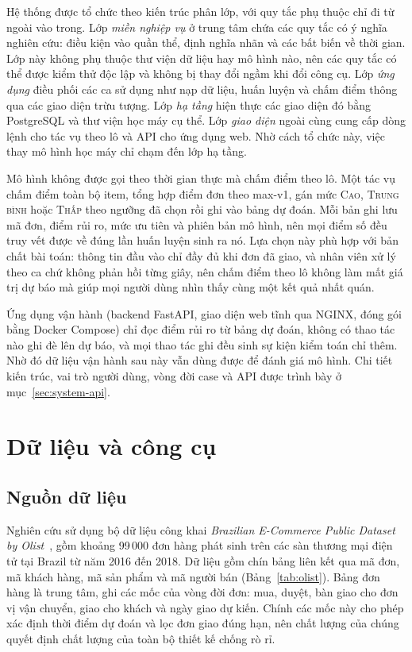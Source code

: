 \documentclass[12pt,a4paper]{report}
\begin{document}
Hệ thống được tổ chức theo kiến trúc phân lớp, với quy tắc phụ thuộc chỉ đi từ ngoài vào trong. Lớp \emph{miền nghiệp vụ} ở trung tâm chứa các quy tắc có ý nghĩa nghiên cứu: điều kiện vào quần thể, định nghĩa nhãn và các bất biến về thời gian. Lớp này không phụ thuộc thư viện dữ liệu hay mô hình nào, nên các quy tắc có thể được kiểm thử độc lập và không bị thay đổi ngầm khi đổi công cụ. Lớp \emph{ứng dụng} điều phối các ca sử dụng như nạp dữ liệu, huấn luyện và chấm điểm thông qua các giao diện trừu tượng. Lớp \emph{hạ tầng} hiện thực các giao diện đó bằng PostgreSQL và thư viện học máy cụ thể. Lớp \emph{giao diện} ngoài cùng cung cấp dòng lệnh cho tác vụ theo lô và API cho ứng dụng web. Nhờ cách tổ chức này, việc thay mô hình học máy chỉ chạm đến lớp hạ tầng.

Mô hình không được gọi theo thời gian thực mà chấm điểm theo lô. Một tác vụ chấm điểm toàn bộ item, tổng hợp điểm đơn theo max-v1, gán mức \textsc{Cao}, \textsc{Trung bình} hoặc \textsc{Thấp} theo ngưỡng đã chọn rồi ghi vào bảng dự đoán. Mỗi bản ghi lưu mã đơn, điểm rủi ro, mức ưu tiên và phiên bản mô hình, nên mọi điểm số đều truy vết được về đúng lần huấn luyện sinh ra nó. Lựa chọn này phù hợp với bản chất bài toán: thông tin đầu vào chỉ đầy đủ khi đơn đã giao, và nhân viên xử lý theo ca chứ không phản hồi từng giây, nên chấm điểm theo lô không làm mất giá trị dự báo mà giúp mọi người dùng nhìn thấy cùng một kết quả nhất quán.

Ứng dụng vận hành (backend FastAPI, giao diện web tĩnh qua NGINX, đóng gói bằng Docker Compose) chỉ đọc điểm rủi ro từ bảng dự đoán, không có thao tác nào ghi đè lên dự báo, và mọi thao tác ghi đều sinh sự kiện kiểm toán chỉ thêm. Nhờ đó dữ liệu vận hành sau này vẫn dùng được để đánh giá mô hình. Chi tiết kiến trúc, vai trò người dùng, vòng đời case và API được trình bày ở mục~\ref{sec:system-api}.

\section{Dữ liệu và công cụ}\label{sec:data}

\subsection{Nguồn dữ liệu}

Nghiên cứu sử dụng bộ dữ liệu công khai \emph{Brazilian E-Commerce Public Dataset by Olist}~\cite{olist2018}, gồm khoảng 99\,000 đơn hàng phát sinh trên các sàn thương mại điện tử tại Brazil từ năm 2016 đến 2018. Dữ liệu gồm chín bảng liên kết qua mã đơn, mã khách hàng, mã sản phẩm và mã người bán (Bảng~\ref{tab:olist}). Bảng đơn hàng là trung tâm, ghi các mốc của vòng đời đơn: mua, duyệt, bàn giao cho đơn vị vận chuyển, giao cho khách và ngày giao dự kiến. Chính các mốc này cho phép xác định thời điểm dự đoán và lọc đơn giao đúng hạn, nên chất lượng của chúng quyết định chất lượng của toàn bộ thiết kế chống rò rỉ.
\end{document}
